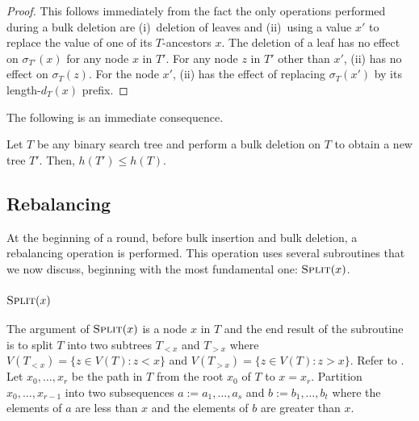 \documentclass[kpfonts]{patmorin}
\let\le\leqslant
\begin{document}
\begin{proof}
  This follows immediately from the fact the only operations performed during a bulk deletion are (i)~deletion of leaves and (ii)~using a value $x'$ to replace the value of one of its $T$-ancestors $x$.  The deletion of a leaf has no effect on $\sigma_{T'}(x)$ for any node $x$ in $T'$.  For any node $z$ in $T'$ other than $x'$, (ii) has no effect on $\sigma_T(z)$.  For the node $x'$, (ii) has the effect of replacing $\sigma_T(x')$ by its length-$d_T(x)$ prefix.  
\end{proof}

The following is an immediate consequence. 

\begin{lem}
  Let $T$ be any binary search tree and perform a bulk deletion on $T$ to obtain a new tree $T'$.  Then, $h(T')\le h(T)$.
\end{lem}


\subsection{Rebalancing}

At the beginning of a round, before bulk insertion and bulk deletion, a rebalancing operation is performed.  This operation uses several subroutines that we now discuss, beginning with the most fundamental one:  $\textsc{Split}(x)$.

\subsubsection{$\textsc{Split}(x)$}

The argument of $\textsc{Split}(x)$ is a node $x$ in $T$ and the end result of the subroutine is to split $T$ into two subtrees $T_{<x}$ and $T_{>x}$ where $V(T_{<x})=\{z\in V(T): z<x\}$ and $V(T_{>x})=\{z\in V(T): z>x\}$. Refer to .  Let $x_0,\ldots,x_r$ be the path in $T$ from the root $x_0$ of $T$ to $x=x_r$.  Partition $x_0,\ldots,x_{r-1}$ into two subsequences $a:=a_1,\ldots,a_s$ and $b:=b_1,\ldots,b_t$ where the elements of $a$ are less than $x$ and the elements of $b$ are greater than $x$.
\end{document}
